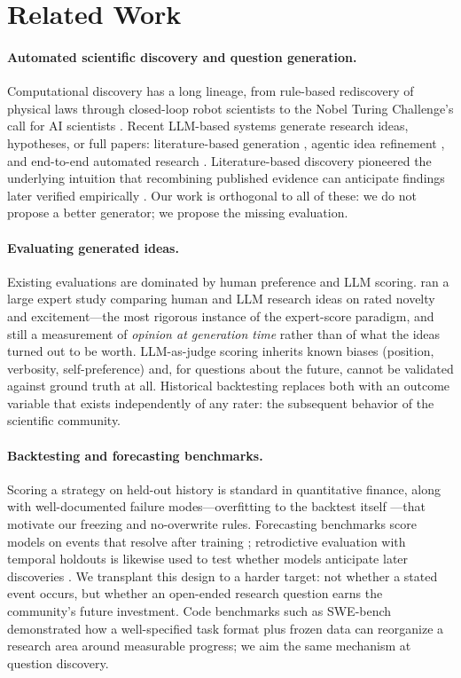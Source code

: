 \section{Related Work}
\label{sec:related}

\paragraph{Automated scientific discovery and question generation.}
Computational discovery has a long lineage, from rule-based rediscovery
of physical laws \citep{langley1987} through closed-loop robot
scientists \citep{king2009} to the Nobel Turing Challenge's call for
AI scientists \citep{kitano2021}. Recent LLM-based systems generate
research ideas, hypotheses, or full papers: literature-based generation
\citep{wang2024scimon}, agentic idea refinement
\citep{baek2024researchagent}, and end-to-end automated research
\citep{lu2024aiscientist}. Literature-based discovery pioneered the
underlying intuition that recombining published evidence can anticipate
findings later verified empirically \citep{swanson1986}. Our work is
orthogonal to all of these: we do not propose a better generator; we
propose the missing evaluation.

\paragraph{Evaluating generated ideas.}
Existing evaluations are dominated by human preference and LLM scoring.
\citet{si2024llmideas} ran a large expert study comparing human and LLM
research ideas on rated novelty and excitement---the most rigorous
instance of the expert-score paradigm, and still a measurement of
\emph{opinion at generation time} rather than of what the ideas turned
out to be worth. LLM-as-judge scoring inherits known biases (position,
verbosity, self-preference) and, for questions about the future,
cannot be validated against ground truth at all. Historical backtesting
replaces both with an outcome variable that exists independently of any
rater: the subsequent behavior of the scientific community.

\paragraph{Backtesting and forecasting benchmarks.}
Scoring a strategy on held-out history is standard in quantitative
finance, along with well-documented failure modes---overfitting to the
backtest itself \citep{bailey2014backtest}---that motivate our
freezing and no-overwrite rules. Forecasting benchmarks score models on
events that resolve after training \citep{zou2022autocast}; retrodictive
evaluation with temporal holdouts is likewise used to test whether
models anticipate later discoveries \citep{swanson1986,king2009}.
We transplant this design to a harder target: not whether a stated
event occurs, but whether an open-ended research question earns the
community's future investment. Code benchmarks such as SWE-bench
\citep{jimenez2024swebench} demonstrated how a well-specified task
format plus frozen data can reorganize a research area around
measurable progress; we aim the same mechanism at question discovery.

